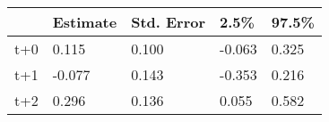 \begin{tabular}{lllll}
  \toprule
  & Estimate & Std. Error & 2.5\% & 97.5\% \\ 
  \midrule
t+0 & 0.115 & 0.100 & -0.063 & 0.325 \\ 
  t+1 & -0.077 & 0.143 & -0.353 & 0.216 \\ 
  t+2 & 0.296 & 0.136 & 0.055 & 0.582 \\ 
   \bottomrule
\end{tabular}
